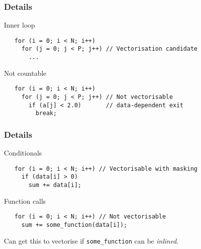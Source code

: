 \documentclass[presentation,aspectratio=43,10pt]{beamer}
\begin{document}
\begin{frame}[fragile]
  \frametitle{Details}
  \begin{answer}{Inner loop}
\begin{verbatim}
   for (i = 0; i < N; i++)
     for (j = 0; j < P; j++) // Vectorisation candidate
       ...
\end{verbatim}
  \end{answer}
  \begin{answer}{Not countable}
\begin{verbatim}
   for (i = 0; i < N; i++)
     for (j = 0; j < P; j++) // Not vectorisable
       if (a[j] < 2.0)       // data-dependent exit
         break;
\end{verbatim}
  \end{answer}
\end{frame}
\begin{frame}[fragile]
  \frametitle{Details}
  \begin{answer}{Conditionals}
\begin{verbatim}
   for (i = 0; i < N; i++) // Vectorisable with masking
     if (data[i] > 0)
       sum += data[i];
\end{verbatim}
  \end{answer}
  \begin{answer}{Function calls}
\begin{verbatim}
   for (i = 0; i < N; i++) // Not vectorisable
     sum += some_function(data[i]);
\end{verbatim}
    Can get this to vectorise if \texttt{some\_function} can be
    \emph{inlined}.
  \end{answer}
\end{frame}
\end{document}
